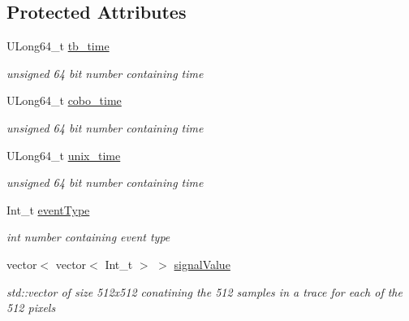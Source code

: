 \subsection*{Protected Attributes}
\begin{DoxyCompactItemize}
\item 
\mbox{\label{classEvent_a8f351e105236524468b73d91d2615b3b}} 
U\+Long64\+\_\+t \hyperlink{classEvent_a8f351e105236524468b73d91d2615b3b}{tb\+\_\+time}
\begin{DoxyCompactList}\small\item\em unsigned 64 bit number containing time \end{DoxyCompactList}\item 
\mbox{\label{classEvent_a2e08e4fe9fcde15df6ca07f3d32ada4a}} 
U\+Long64\+\_\+t \hyperlink{classEvent_a2e08e4fe9fcde15df6ca07f3d32ada4a}{cobo\+\_\+time}
\begin{DoxyCompactList}\small\item\em unsigned 64 bit number containing time \end{DoxyCompactList}\item 
\mbox{\label{classEvent_a0b1b0be65d07df7718ac5862e79a8d50}} 
U\+Long64\+\_\+t \hyperlink{classEvent_a0b1b0be65d07df7718ac5862e79a8d50}{unix\+\_\+time}
\begin{DoxyCompactList}\small\item\em unsigned 64 bit number containing time \end{DoxyCompactList}\item 
\mbox{\label{classEvent_a80a5b8fc11fb6501fdc9962c9ae3825a}} 
Int\+\_\+t \hyperlink{classEvent_a80a5b8fc11fb6501fdc9962c9ae3825a}{event\+Type}
\begin{DoxyCompactList}\small\item\em int number containing event type \end{DoxyCompactList}\item 
\mbox{\label{classEvent_a7332d4d5c8ad1d7d81e2c7c2e44bc27b}} 
vector$<$ vector$<$ Int\+\_\+t $>$ $>$ \hyperlink{classEvent_a7332d4d5c8ad1d7d81e2c7c2e44bc27b}{signal\+Value}
\begin{DoxyCompactList}\small\item\em std\+::vector of size 512x512 conatining the 512 samples in a trace for each of the 512 pixels \end{DoxyCompactList}\item 

\end{DoxyCompactItemize}

